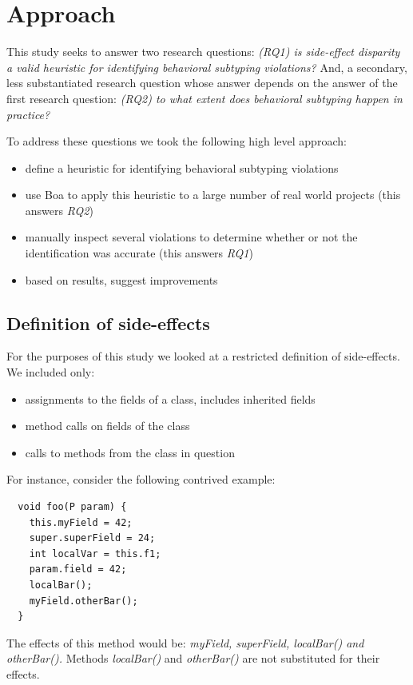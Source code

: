 \documentclass{acm_proc_article-sp}
\begin{document}
\section{Approach}
This study seeks to answer two research questions: \emph{(RQ1) is side-effect disparity a valid heuristic for identifying behavioral subtyping violations?} And, a secondary, less substantiated research question whose answer depends on the answer of the first research question: \emph{(RQ2) to what extent does behavioral subtyping happen in practice?}

To address these questions we took the following high level approach:
\begin{itemize}
\item define a heuristic for identifying behavioral subtyping violations
\item use Boa to apply this heuristic to a large number of real world projects (this answers \emph{RQ2})
\item manually inspect several violations to determine whether or not the identification was accurate (this  answers \emph{RQ1})
\item based on results, suggest improvements
\end{itemize}

\subsection{Definition of side-effects}\label{definition:side-effects}
For the purposes of this study we looked at a restricted definition of side-effects. We included only:
\begin{itemize}
\item assignments to the fields of a class, includes inherited fields
\item method calls on fields of the class
\item calls to methods from the class in question
\end{itemize}
For instance, consider the following contrived example:
\begin{lstlisting}
  void foo(P param) {
    this.myField = 42;
    super.superField = 24;
    int localVar = this.f1;
    param.field = 42;
    localBar();
    myField.otherBar();
  }
\end{lstlisting}
The effects of this method would be: \emph{myField, superField, localBar() and otherBar().} Methods \emph{localBar()} and \emph{otherBar()} are not substituted for their effects.
\end{document}
